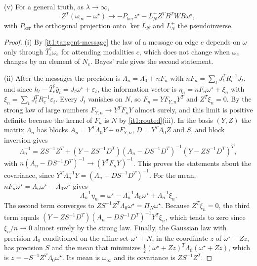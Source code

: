 \documentclass[11pt,letterpaper]{report}
\begin{document}
\textup{(v)} For a general truth, as $\lambda\to\infty$,
\begin{equation}
Z^T(\omega_\infty-\omega^\star)\longrightarrow-P_{\ker}z^\star-L_N^+Z^TB^TWB\omega^\star,
\label{it1:bias}
\end{equation}
with $P_{\ker}$ the orthogonal projection onto $\ker L_N$ and $L_N^+$ the pseudoinverse.
\begin{proof}
(i) By \cref{it1:tangent-message} the law of a message on edge $e$ depends on $\omega$ only through $\bar T_e^c\omega_e$ for attending modalities $c$, which does not change when $\omega_e$ changes by an element of $N_e$. Bayes' rule gives the second statement.

(ii) After the messages the precision is $\Lambda_n=\Lambda_0+nF_n$ with $nF_n=\sum_tJ_t^TR_c^{-1}J_t$, and since $h_t-\bar T_e^c\bar y_t=J_t\omega^\star+\varepsilon_t$, the information vector is $\eta_n=nF_n\omega^\star+\xi_n$ with $\xi_n=\sum_tJ_t^TR_c^{-1}\varepsilon_t$. Every $J_t$ vanishes on $N$, so $F_n=YF_{Y,n}Y^T$ and $Z^T\xi_n=0$. By the strong law of large numbers $F_{Y,n}\to Y^TF_\kappa Y$ almost surely, and this limit is positive definite because the kernel of $F_\kappa$ is $N$ by \cref{it1:routed}(iii). In the basis $(Y,Z)$ the matrix $\Lambda_n$ has blocks $A_n=Y^T\Lambda_0Y+nF_{Y,n}$, $D=Y^T\Lambda_0Z$ and $S$, and block inversion gives
\begin{equation}
\Lambda_n^{-1}=ZS^{-1}Z^T+(Y-ZS^{-1}D^T)(A_n-DS^{-1}D^T)^{-1}(Y-ZS^{-1}D^T)^T,
\end{equation}
with $n(A_n-DS^{-1}D^T)^{-1}\to(Y^TF_\kappa Y)^{-1}$. This proves the statements about the covariance, since $Y^T\Lambda_n^{-1}Y=(A_n-DS^{-1}D^T)^{-1}$. For the mean, $nF_n\omega^\star=\Lambda_n\omega^\star-\Lambda_0\omega^\star$ gives
\begin{equation}
\Lambda_n^{-1}\eta_n=\omega^\star-\Lambda_n^{-1}\Lambda_0\omega^\star+\Lambda_n^{-1}\xi_n.
\end{equation}
The second term converges to $ZS^{-1}Z^T\Lambda_0\omega^\star=\Pi_N\omega^\star$. Because $Z^T\xi_n=0$, the third term equals $(Y-ZS^{-1}D^T)(A_n-DS^{-1}D^T)^{-1}Y^T\xi_n$, which tends to zero since $\xi_n/n\to0$ almost surely by the strong law. Finally, the Gaussian law with precision $\Lambda_0$ conditioned on the affine set $\omega^\star+N$, in the coordinate $z$ of $\omega^\star+Zz$, has precision $S$ and the mean that minimizes $\frac12(\omega^\star+Zz)^T\Lambda_0(\omega^\star+Zz)$, which is $z=-S^{-1}Z^T\Lambda_0\omega^\star$. Its mean is $\omega_\infty$ and its covariance is $ZS^{-1}Z^T$.


\end{proof}
\end{document}
